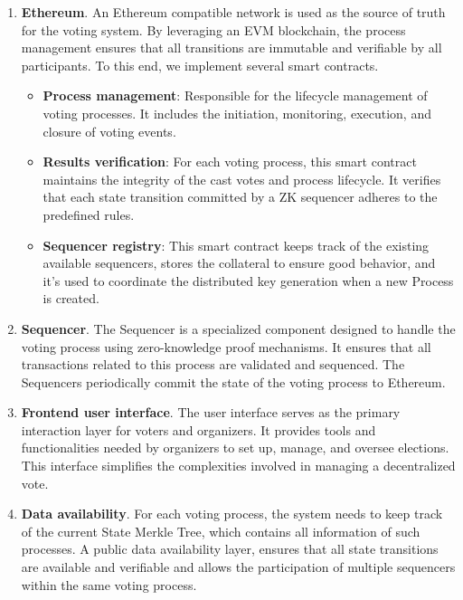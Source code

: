 \begin{enumerate}
	\item \textbf{Ethereum}. An Ethereum compatible network is used as the source of truth for the voting system. By leveraging an EVM blockchain, the process management ensures that all transitions are immutable and verifiable by all participants. To this end, we implement several smart contracts.
		\begin{itemize}
			\item \textbf{Process management}: Responsible for the lifecycle management of voting processes. It includes the initiation, monitoring, execution, and closure of voting events.
			\item \textbf{Results verification}: For each voting process, this smart contract maintains the integrity of the cast votes and process lifecycle. It verifies that each state transition committed by a ZK sequencer adheres to the predefined rules.			
			\item \textbf{Sequencer registry}: This smart contract keeps track of the existing available sequencers, stores the collateral to ensure good behavior, and it's used to coordinate the distributed key generation when a new Process is created.
		\end{itemize}
	\item \textbf{Sequencer}. The Sequencer is a specialized component designed to handle the voting process using zero-knowledge proof mechanisms. It ensures that all transactions related to this process are validated and sequenced. The Sequencers periodically commit the state of the voting process to Ethereum.
	\item \textbf{Frontend user interface}. The user interface serves as the primary interaction layer for voters and organizers. It provides tools and functionalities needed by organizers to set up, manage, and oversee elections. This interface simplifies the complexities involved in managing a decentralized vote.
	\item \textbf{Data availability}. For each voting process, the system needs to keep track of the current State Merkle Tree, which contains all information of such processes. A public data availability layer, ensures that all state transitions are available and verifiable and allows the participation of multiple sequencers within the same voting process.
\end{enumerate}
